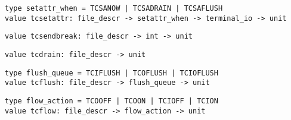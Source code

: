 %
\begin{comment}
 Return the status of the terminal referred to by the given
           file descriptor. 
\end{comment}
\begin{verbatim}
type setattr_when = TCSANOW | TCSADRAIN | TCSAFLUSH
value tcsetattr: file_descr -> setattr_when -> terminal_io -> unit
\end{verbatim}
%
\begin{comment}
 Set the status of the terminal referred to by the given
           file descriptor. The second argument indicates when the
           status change takes place: immediately (\verbTCSANOW),
           when all pending output has been transmitted (\verbTCSADRAIN),
           or after flushing all input that has been received but not
           read (\verbTCSAFLUSH). \verbTCSADRAIN is recommended when changing
           the output parameters; \verbTCSAFLUSH, when changing the input
           parameters. 
\end{comment}
\begin{verbatim}
value tcsendbreak: file_descr -> int -> unit
\end{verbatim}
%
\begin{comment}
 Send a break condition on the given file descriptor.
           The second argument is the duration of the break, in 0.1s units;
           0 means standard duration (0.25s). 
\end{comment}
\begin{verbatim}
value tcdrain: file_descr -> unit
\end{verbatim}
%
\begin{comment}
 Waits until all output written on the given file descriptor
           has been transmitted. 
\end{comment}
\begin{verbatim}
type flush_queue = TCIFLUSH | TCOFLUSH | TCIOFLUSH
value tcflush: file_descr -> flush_queue -> unit
\end{verbatim}
%
\begin{comment}
 Discard data written on the given file descriptor but not yet
           transmitted, or data received but not yet read, depending on the
           second argument: \verbTCIFLUSH flushes data received but not read,
           \verbTCOFLUSH flushes data written but not transmitted, and
           \verbTCIOFLUSH flushes both. 
\end{comment}
\begin{verbatim}
type flow_action = TCOOFF | TCOON | TCIOFF | TCION
value tcflow: file_descr -> flow_action -> unit
\end{verbatim}
%
\begin{comment}
 Suspend or restart reception or transmission of data on
           the given file descriptor, depending on the second argument:
           \verbTCOOFF suspends output, \verbTCOON restarts output,
           \verbTCIOFF transmits a STOP character to suspend input,
           and \verbTCION transmits a START character to restart input. 
\end{comment}
